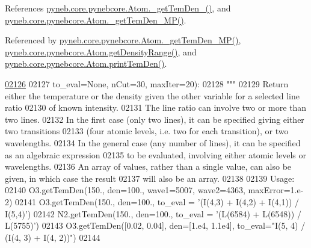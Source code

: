 References \hyperlink{pynebcore_8py_source_l01869}{pyneb.\-core.\-pynebcore.\-Atom.\-\_\-get\-Tem\-Den\-\_()}, and \hyperlink{pynebcore_8py_source_l02046}{pyneb.\-core.\-pynebcore.\-Atom.\-\_\-get\-Tem\-Den\-\_\-\-M\-P()}.



Referenced by \hyperlink{pynebcore_8py_source_l02046}{pyneb.\-core.\-pynebcore.\-Atom.\-\_\-get\-Tem\-Den\-\_\-\-M\-P()}, \hyperlink{pynebcore_8py_source_l01742}{pyneb.\-core.\-pynebcore.\-Atom.\-get\-Density\-Range()}, and \hyperlink{pynebcore_8py_source_l02324}{pyneb.\-core.\-pynebcore.\-Atom.\-print\-Tem\-Den()}.


\begin{DoxyCode}
\hypertarget{classpyneb_1_1core_1_1pynebcore_1_1_atom_l02126}{}\hyperlink{classpyneb_1_1core_1_1pynebcore_1_1_atom_a5e1aa59c92bf62bae8bd756a4405eb25}{02126} 
02127                   to\_eval=\textcolor{keywordtype}{None}, nCut=30, maxIter=20):
02128         \textcolor{stringliteral}{"""}
02129 \textcolor{stringliteral}{        Return either the temperature or the density given the other variable for a selected line ratio }
02130 \textcolor{stringliteral}{            of known intensity.}
02131 \textcolor{stringliteral}{        The line ratio can involve two or more than two lines. }
02132 \textcolor{stringliteral}{        In the first case (only two lines), it can be specified giving either two transitions }
02133 \textcolor{stringliteral}{            (four atomic levels, i.e. two for each transition), or two wavelengths.}
02134 \textcolor{stringliteral}{        In the general case (any number of lines), it can be specified as an algebraic expression }
02135 \textcolor{stringliteral}{            to be evaluated, involving either atomic levels or wavelengths.}
02136 \textcolor{stringliteral}{        An array of values, rather than a single value, can also be given, in which case the result }
02137 \textcolor{stringliteral}{            will also be an array.}
02138 \textcolor{stringliteral}{            }
02139 \textcolor{stringliteral}{        Usage: }
02140 \textcolor{stringliteral}{            O3.getTemDen(150., den=100., wave1=5007, wave2=4363, maxError=1.e-2)}
02141 \textcolor{stringliteral}{            O3.getTemDen(150., den=100., to\_eval = '(I(4,3) + I(4,2) + I(4,1)) / I(5,4)')}
02142 \textcolor{stringliteral}{            N2.getTemDen(150., den=100., to\_eval = '(L(6584) + L(6548)) / L(5755)')}
02143 \textcolor{stringliteral}{            O3.getTemDen([0.02, 0.04], den=[1.e4, 1.1e4], to\_eval="I(5, 4) / (I(4, 3) + I(4, 2))")}
02144 \textcolor{stringliteral}{}

\end{DoxyCode}
